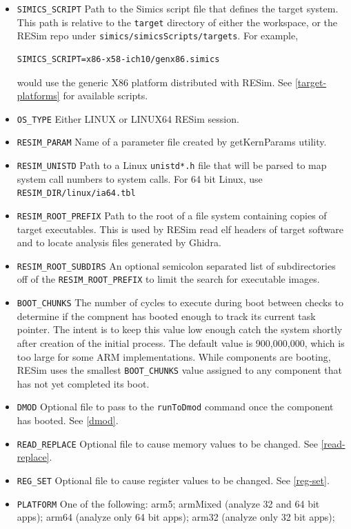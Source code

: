 \documentclass[titlepage]{article}
\begin{document}
\begin{itemize}
\item {\tt SIMICS\_SCRIPT} Path to the Simics script file that defines the target system.  This path is relative to the {\tt target} directory
of either the workspace, or the RESim repo under {\tt simics/simicsScripts/targets}.  For example, 
\begin{verbatim}
SIMICS_SCRIPT=x86-x58-ich10/genx86.simics
\end{verbatim}
\noindent would use the generic X86 platform distributed with RESim.  See \ref{target-platforms} for available scripts.
\item {\tt OS\_TYPE} Either LINUX or LINUX64
RESim session.
\item {\tt RESIM\_PARAM} Name of a parameter file created by getKernParams utility.
\item {\tt RESIM\_UNISTD} Path to a Linux {\tt unistd*.h} file that will be parsed to map system call numbers to system calls.  For 64 bit
Linux, use {\tt RESIM\_DIR/linux/ia64.tbl}
\item {\tt RESIM\_ROOT\_PREFIX} Path to the root of a file system containing copies of target executables.  This is used by RESim read elf
headers of target software and to locate analysis files generated by Ghidra. 
\item {\tt RESIM\_ROOT\_SUBDIRS} An optional semicolon separated list of subdirectories off of the {\tt RESIM\_ROOT\_PREFIX} to limit the 
search for executable images.
\item {\tt BOOT\_CHUNKS} The number of cycles to execute during boot between checks to determine if the compnent has booted enough to track
its current task pointer.  The intent is to keep this value low enough catch the system shortly after creation of the initial process.
The default value is 900,000,000, which is too large for some ARM implementations.  While components are booting, RESim uses the smallest
{\tt BOOT\_CHUNKS} value assigned to any component that has not yet completed its boot.
\item {\tt DMOD} Optional file to pass to the {\tt runToDmod} command once the component has booted.  See \ref{dmod}.
\item {\tt READ\_REPLACE} Optional file to cause memory values to be changed.  See \ref{read-replace}.
\item {\tt REG\_SET} Optional file to cause register values to be changed.  See \ref{reg-set}.
\item {\tt PLATFORM} One of the following: arm5; armMixed (analyze 32 and 64 bit apps); arm64 (analyze only 64 bit apps); arm32 (analyze only 32 bit apps);

\end{itemize}
\end{document}
